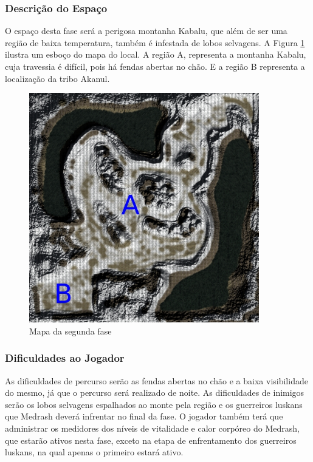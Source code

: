 \subsubsection{Descrição do Espaço}

O espaço desta fase será a perigosa montanha Kabalu, que além de ser uma região de baixa temperatura, também é infestada de lobos selvagens. A Figura \ref{fig:MapaDaFase2} ilustra um esboço do mapa do local. A região A, representa a montanha Kabalu, cuja travessia é difícil, pois há fendas abertas no chão. E a região B representa a localização da tribo Akanul.

\begin{figure}[h]
\centering
\includegraphics[width=10cm]{fases_mapa_2.jpg} 
\caption{Mapa da segunda fase}
\label{fig:MapaDaFase2}
\end{figure}

\subsubsection{Dificuldades ao Jogador}

As dificuldades de percurso serão as fendas abertas no chão e a baixa visibilidade do mesmo, já que o percurso será realizado de noite. As dificuldades de inimigos serão os lobos selvagens espalhados ao monte pela região e os guerreiros luskans que Medrash deverá infrentar no final da fase. O jogador também terá que administrar os medidores dos níveis de vitalidade e calor corpóreo do Medrash, que estarão ativos nesta fase, exceto na etapa de enfrentamento dos guerreiros luskans, na qual apenas o primeiro estará ativo.

